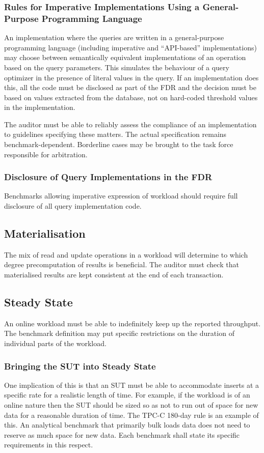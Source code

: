 \subsubsection{Rules for Imperative Implementations Using a General-Purpose Programming Language}
An implementation where the queries are written in a general-purpose programming language (including imperative and ``API-based'' implementations) may choose between semantically equivalent implementations of an operation based on the query parameters. This simulates the behaviour of a query optimizer in the presence of literal values in the query. If an implementation does this, all the code must be disclosed as part of the FDR and the decision must be based on values extracted from the database, not on hard-coded threshold values in the implementation.

The auditor must be able to reliably assess the compliance of an implementation to guidelines specifying these matters. The actual specification remains benchmark-dependent. Borderline cases may be brought to the task force responsible for arbitration.


\subsubsection{Disclosure of Query Implementations in the FDR}
Benchmarks allowing imperative expression of workload should require full disclosure of all query implementation code.

\subsection{Materialisation}

The mix of read and update operations in a workload will determine to which degree precomputation of results is beneficial. The auditor must check that materialised results are kept consistent at the end of each transaction.

\subsection{Steady State}

An online workload must be able to indefinitely keep up the reported throughput. The benchmark definition may put specific restrictions on the duration of individual parts of the workload.

\subsubsection{Bringing the SUT into Steady State} One implication of this is that an SUT must be able to accommodate inserts at a specific rate for a realistic length of time. For example, if the workload is of an online nature then the SUT should be sized so as not to run out of space for new data for a reasonable duration of time. The \mbox{TPC-C} 180-day rule is an example of this. An analytical benchmark that primarily bulk loads data does not need to reserve as much space for new data. Each benchmark shall state its specific requirements in this respect.

